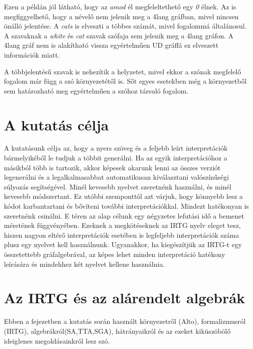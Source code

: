Ezen a példán jól látható, hogy az \textit{amod} él megfeleltethető egy \textit{0} élnek.
Az is megfiggyelhető, hogy a névelő nem jelenik meg a 4lang gráfban, mivel nincsen önálló jelentése.
A \textit{cats} is elveszti a többes számát, mivel fogalommá általánosul.
A szavaknak a \textit{white} és \textit{cat} szavak szófaja sem jelenik meg a 4lang gráfon.
A 4lang gráf nem is alakítható vissza egyértelműen UD gráffá ez elveszett információk miatt.

A többjelentésű szavak is nehezítik a helyzetet, mivel ekkor a szónak megfelelő fogalom már függ a szó környezetétől is.
Sőt egyes esetekben még a környezetből sem határozható meg egyértelműen a szóhoz társuló fogalom. 


\section{A kutatás célja}


A kutatásunk célja az, hogy a nyers szöveg és a feljebb leírt interpretációk bármelyikéből le tudjuk a többit generálni. Ha az egyik interpretációhoz a másikból több is tartozik, akkor képesek akarunk lenni az összes verziót legenerálni és a legalkalmasabbat automatikusan kiválasztani valószínűségi súlyozás segítségével. Minél kevesebb nyelvet szeretnénk használni, és minél kevesebb módszertant. Ez utóbbi szemponttól azt várjuk, hogy könnyebb lesz a kódot karbantartani és bővíteni további interpretációkkal. Mindezt hatékonyan is szeretnénk csinálni. E téren az alap célunk egy négyzetes lefutási idő a bemenet méretének függvényében. Ezeknek a megkötéseknek az IRTG nyelv eleget tesz, hiszen nagyon eltérő interpretációk esetében is legfeljebb interpretációk száma plusz egy nyelvet kell használnunk. Ugyanakkor, ha kiegészítjük az IRTG-t egy összetettebb gráfalgebrával, az képes lehet minden interpretáció hatékony leírására és mindehhez két nyelvet kellene használnia.

\section{Az IRTG és az alárendelt algebrák}
Ebben a fejezetben a kutatás során használt környezetről (Alto), formalizmusról (IRTG), algebrákról(SA,TTA,SGA), hátrányaikról és az ezeket kiküszöbölő ideiglenes megoldásainkról lesz szó.


